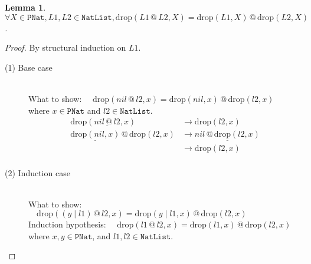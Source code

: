 \documentclass[12pt, a4paper]{article}
\newtheorem{lemma}[theorem]{Lemma}
\newcommand{\rel}[1]{\mathrel{#1}}
\newcommand{\rmx}[1]{\mathrm{#1}}
\newcommand{\larrow}{\longrightarrow}
\newcommand{\under}{\underline}
\begin{document}
\begin{lemma}
\label{lm1}
$\forall X \in \mathtt{PNat}, L1, L2 \in \mathtt{NatList}, \rmx{drop}(L1 \rel{@} L2, X) = \rmx{drop}(L1, X) \rel{@} \rmx{drop}(L2, X)$.
\end{lemma}
\begin{proof}
By structural induction on $L1$.

\begin{description}

\item[(1) Base case]~\\
\noindent
What to show: $\quad \rmx{drop}(nil \rel{@} l2, x) = \rmx{drop}(nil, x) \rel{@} \rmx{drop}(l2, x)$ \\
where $x \in \mathtt{PNat}$ and $l2 \in \mathtt{NatList}$.
\begin{align*}
\rmx{drop}(\under{nil \rel{@} l2}, x)
	&\larrow \rmx{drop}(l2, x) \tag{by @1} \\
\under{\rmx{drop}(nil, x)} \rel{@} \rmx{drop}(l2, x)
	&\larrow \under{nil \rel{@} \rmx{drop}(l2, x)} \tag{by drop1} \\
	&\larrow \rmx{drop}(l2, x) \tag{by @1} \\
\end{align*}

\item[(2) Induction case]~\\
What to show: $\quad \rmx{drop}((y \rel{|} l1) \rel{@} l2, x) = \rmx{drop}(y \rel{|} l1, x) \rel{@} \rmx{drop}(l2, x)$ \\
Induction hypothesis: $\quad \rmx{drop}(l1 \rel{@} l2, x) = \rmx{drop}(l1, x) \rel{@} \rmx{drop}(l2, x)$ \\
where $x, y \in \mathtt{PNat}$, and $l1, l2 \in \mathtt{NatList}$.


\end{description}
\end{proof}
\end{document}
